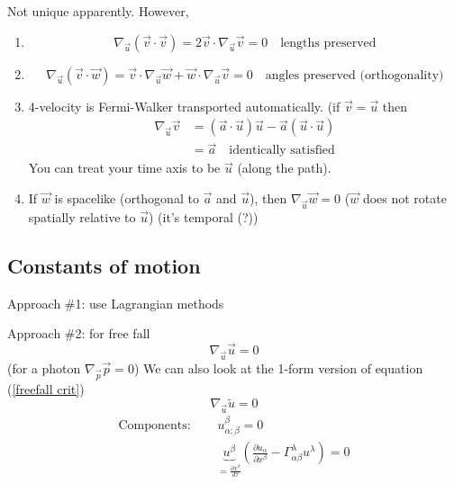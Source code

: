\documentclass[a4paper]{article} %
\renewcommand{\tilde}{\widetilde}
\begin{document}
Not unique apparently. However,
\begin{enumerate}
\item 
\begin{equation}
\nabla_{\vec{u}}(\vec{v}\cdot\vec{v})=2\vec{v}\cdot\nabla_{\vec{u}}\vec{v}=0\quad\text{lengths preserved}
\end{equation}
\item 
\begin{equation}
\nabla_{\vec{u}}(\vec{v}\cdot\vec{w})=\vec{v}\cdot\nabla_{\vec{u}}\vec{w}+\vec{w}\cdot\nabla_{\vec{u}}\vec{v}=0
\quad\text{angles preserved (orthogonality)}
\end{equation}
\item
4-velocity is Fermi-Walker transported automatically. (if $\vec{v}=\vec{u}$ then
\begin{align}
\nabla_{\vec{u}}\vec{v}&=(\vec{a}\cdot\vec{u})\vec{u}-\vec{a}(\vec{u}\cdot\vec{u})\\
&=\vec{a}\quad\text{identically satisfied}
\end{align}
You can treat your time axis to be $\vec{u}$ (along the path).
\item
If $\vec{w}$ is spacelike (orthogonal to $\vec{a}$ and $\vec{u}$), then $\nabla_{\vec{u}}\vec{w}=0$ ($\vec{w}$ does not rotate spatially relative to $\vec{u}$) (it's temporal (?))
\end{enumerate}

\subsection{Constants of motion}

Approach \#1: use Lagrangian methods

Approach \#2: for free fall
\begin{equation}
\nabla_{\vec{u}}\vec{u}=0 \label{freefall crit}
\end{equation}
(for a photon $\nabla_{\vec{p}}\vec{p}=0$)
We can also look at the 1-form version of equation (\ref{freefall crit})
\begin{equation}
\nabla_{\vec{u}}\tilde{u}=0
\end{equation}
\begin{align}
\text{Components: }\quad&u^{\beta}_{\alpha;\beta}=0\\
&\underbrace{u^{\beta}}_{=\frac{\partial x^{\beta}}{d\tau}}
\left(\frac{\partial u_{\alpha}}{\partial x^{\beta}}-\Gamma^{\lambda}_{\alpha\beta}u^{\lambda}\right)=0
\end{align}
\end{document}
